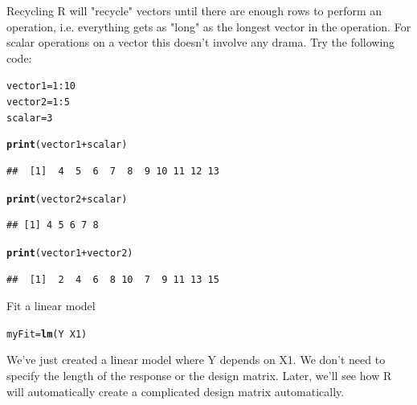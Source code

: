 \documentclass[xcolor=dvipsnames]{beamer}
\makeatletter
\newcommand{\hlnum}[1]{\textcolor[rgb]{0.686,0.059,0.569}{#1}}%
\newcommand{\hlopt}[1]{\textcolor[rgb]{0,0,0}{#1}}%
\newcommand{\hlstd}[1]{\textcolor[rgb]{0.345,0.345,0.345}{#1}}%
\newcommand{\hlkwb}[1]{\textcolor[rgb]{0.69,0.353,0.396}{#1}}%
\newcommand{\hlkwd}[1]{\textcolor[rgb]{0.737,0.353,0.396}{\textbf{#1}}}%
\newenvironment{kframe}{%
 \def\at@end@of@kframe{}%
 \ifinner\ifhmode%
  \def\at@end@of@kframe{\end{minipage}}%
  \begin{minipage}{\columnwidth}%
 \fi\fi%
 \def\FrameCommand##1{\hskip\@totalleftmargin \hskip-\fboxsep
 \colorbox{shadecolor}{##1}\hskip-\fboxsep
     \hskip-\linewidth \hskip-\@totalleftmargin \hskip\columnwidth}%
 \MakeFramed {\advance\hsize-\width
   \@totalleftmargin\z@ \linewidth\hsize
   \@setminipage}}%
 {\par\unskip\endMakeFramed%
 \at@end@of@kframe}
\newenvironment{knitrout}{}{} %
\makeatother
\begin{document}
\begin{frame}[fragile]{Recycling}
R will "recycle" vectors until there are enough rows to perform an operation, i.e. everything gets as "long" as the longest vector in the operation. For scalar operations on a vector this doesn't involve any drama. Try the following code:
\begin{knitrout}\tiny
{}\color{fgcolor}\begin{kframe}
\begin{alltt}
\hlstd{vector1} \hlkwb{=} \hlnum{1}\hlopt{:}\hlnum{10}
\hlstd{vector2} \hlkwb{=} \hlnum{1}\hlopt{:}\hlnum{5}
\hlstd{scalar} \hlkwb{=} \hlnum{3}

\hlkwd{print}\hlstd{(vector1} \hlopt{+} \hlstd{scalar)}
\end{alltt}
\begin{verbatim}
##  [1]  4  5  6  7  8  9 10 11 12 13
\end{verbatim}
\begin{alltt}
\hlkwd{print}\hlstd{(vector2} \hlopt{+} \hlstd{scalar)}
\end{alltt}
\begin{verbatim}
## [1] 4 5 6 7 8
\end{verbatim}
\begin{alltt}
\hlkwd{print}\hlstd{(vector1} \hlopt{+} \hlstd{vector2)}
\end{alltt}
\begin{verbatim}
##  [1]  2  4  6  8 10  7  9 11 13 15
\end{verbatim}
\end{kframe}
\end{knitrout}

\end{frame}

\begin{frame}[fragile]{Fit a linear model}
\begin{knitrout}
\color{fgcolor}\begin{kframe}
\begin{alltt}
\hlstd{myFit} \hlkwb{=} \hlkwd{lm}\hlstd{(Y} \hlopt{~} \hlstd{X1)}
\end{alltt}
\end{kframe}
\end{knitrout}

We've just created a linear model where Y depends on X1. We don't need to specify the length of the response or the design matrix. Later, we'll see how R will automatically create a complicated design matrix automatically.
\end{frame}
\end{document}
